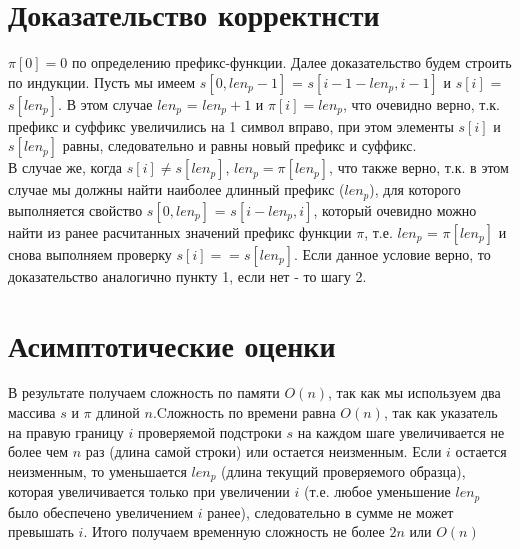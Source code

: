 \documentclass[12pt]{article}
\begin{document}
\section{Доказательство корректнсти}
$\pi[0] = 0$ по определению префикс-функции. Далее доказательство будем строить по индукции. Пусть мы имеем $s[0,len_p-1]$ = $s[i-1-len_p, i-1]$ и $s[i]$ = $s[len_p]$. В этом случае $len_p$ = $len_p + 1$ и $\pi[i] = len_p$, что очевидно верно, т.к. префикс и суффикс увеличились на 1 символ вправо, при этом элементы $s[i]$ и $s[len_p]$ равны, следовательно и равны новый префикс и суффикс.\\
В случае же, когда $s[i] \neq s[len_p]$, $len_p = \pi[len_p]$, что также верно, т.к. в этом случае мы должны найти наиболее длинный префикс ($len_p$), для которого выполняется свойство $s[0,len_p]$ = $s[i-len_p, i]$, который очевидно можно найти из ранее расчитанных значений префикс функции $\pi$, т.е. $len_p$ = $\pi[len_p]$ и снова выполняем проверку $s[i] == s[len_p]$. Если данное условие верно, то доказательство аналогично пункту 1, если нет - то шагу 2.




\section{Асимптотические оценки}
В результате получаем сложность по памяти $O(n)$, так как мы используем два массива $s$ и $\pi$ длиной $n$.Cложность по времени равна $O(n)$, так как указатель на правую границу $i$ проверяемой подстроки $s$ на каждом шаге увеличивается не более чем $n$ раз (длина самой строки) или остается неизменным. Если $i$ остается неизменным, то уменьшается $len_p$ (длина текущий проверяемого образца), которая увеличивается только при увеличении $i$ (т.е. любое уменьшение $len_p$ было обеспечено увеличением $i$ ранее), следовательно в сумме не может превышать $i$. Итого получаем временную сложность не более $2n$ или $O(n)$
\end{document}
